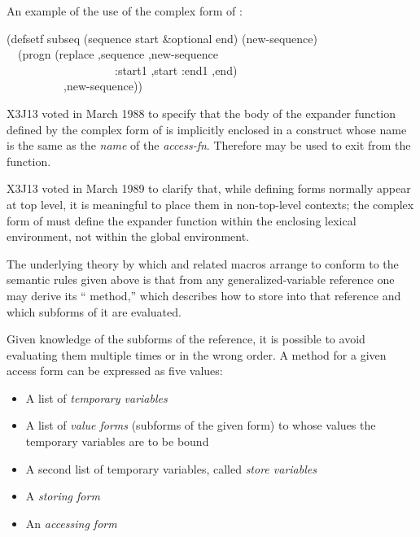 \begin{defmac}
An example of the use of the complex form of :
\begin{lisp}
(defsetf subseq (sequence start \&optional end) (new-sequence) \\
~~{\Xbq}(progn (replace ,sequence ,new-sequence \\
~~~~~~~~~~~~~~~~~~~:start1 ,start :end1 ,end) \\
~~~~~~~~~~,new-sequence))
\end{lisp}

\begin{newer}
X3J13 voted in March 1988 
to specify that the body of the expander function defined
by the complex form of  is implicitly enclosed in a  construct
whose name is the same as the \emph{name} of the \emph{access-fn}.
Therefore  may be used to exit from the function.
\end{newer}

\begin{newer}
X3J13 voted in March 1989 
to clarify that, while defining forms normally appear at top level,
it is meaningful to place them in non-top-level contexts; the complex form of
 must define the expander function
within the enclosing lexical environment, not within the global
environment.
\end{newer}
\end{defmac}

The underlying theory by which  and related macros arrange to
conform to the semantic rules given above is that from any
generalized-variable reference one may derive its `` method,''
which describes how to store into that reference and which subforms of
it are evaluated.

Given knowledge of the subforms of the reference,
it is possible to avoid evaluating them multiple times or in the wrong
order.  A  method for a given access form can be expressed as
five values:
\begin{itemize}
\item
A list of \emph{temporary variables}

\item
A list of \emph{value forms} (subforms of the given form)
to whose values the temporary variables are to be bound

\item
A second list of temporary variables, called \emph{store variables}

\item
A \emph{storing form}

\item
An \emph{accessing form}
\end{itemize}

